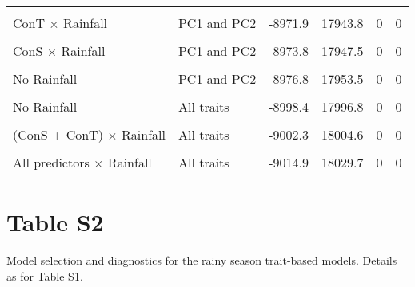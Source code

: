 \documentclass[
  12pt,
  letterpaper,
  DIV=11,
  numbers=noendperiod]{scrartcl}
\begin{document}
\begin{longtable*}[t]{llllrr}
\endfoot
\bottomrule
\endlastfoot
{} &  &  &  &  & \\
ConT $\times$ Rainfall & PC1 and PC2 & -8971.9 & 17943.8 & 0 & 0\\
 &  &  &  &  & \\
ConS $\times$ Rainfall & PC1 and PC2 & -8973.8 & 17947.5 & 0 & 0\\
 &  &  &  &  & \\
\addlinespace
No Rainfall & PC1 and PC2 & -8976.8 & 17953.5 & 0 & 0\\
 &  &  &  &  & \\
No Rainfall & All traits & -8998.4 & 17996.8 & 0 & 0\\
 &  &  &  &  & \\
(ConS + ConT) $\times$ Rainfall & All traits & -9002.3 & 18004.6 & 0 & 0\\
\addlinespace
{} &  &  &  &  & \\
All predictors $\times$ Rainfall & All traits & -9014.9 & 18029.7 & 0 & 0\\*
\end{longtable*}

\newpage

\hypertarget{table-s2}{%
\section{Table S2}\label{table-s2}}

Model selection and diagnostics for the rainy season trait-based models.
Details as for Table S1.
\end{document}
